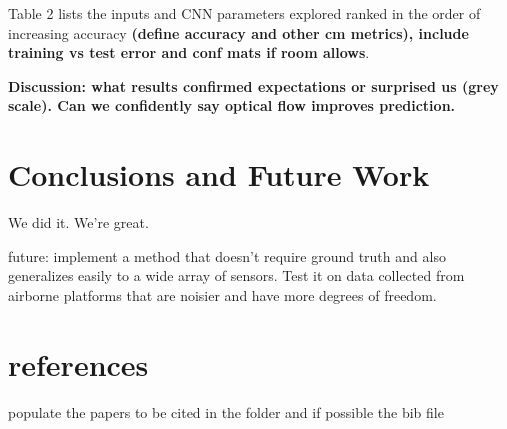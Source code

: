 \documentclass{article}
\begin{document}
Table 2 lists the inputs and CNN parameters explored ranked in the order of increasing accuracy \textbf{(define accuracy and other cm metrics), include training vs test error and conf mats if room allows}.  

 \textbf{Discussion: what results confirmed expectations or surprised us (grey scale). Can we confidently say optical flow improves prediction. }



\section{Conclusions and Future Work} %
\label{sec:conclusions_and_future_work}
We did it. We're great.

future: implement a method that doesn't require ground truth and also generalizes easily to a wide array of sensors. Test it on data collected from airborne platforms that are noisier and have more degrees of freedom. 



\section{references}
populate the papers to be cited in the folder and if possible the bib file




\end{document}
